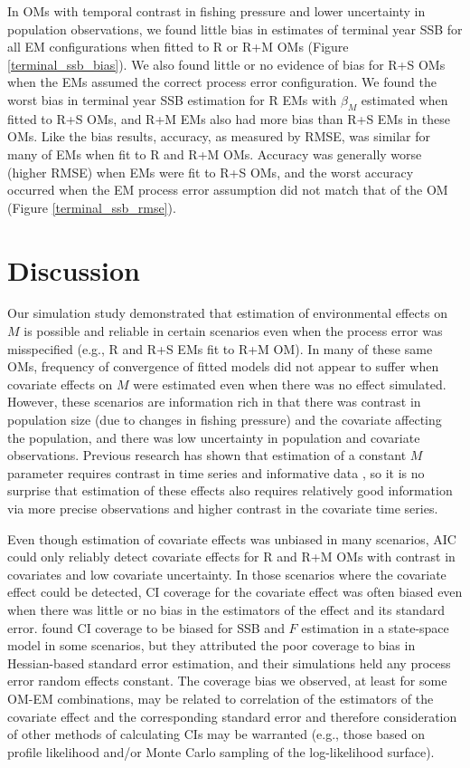 \documentclass[
  12pt,
]{article}
\begin{document}
In OMs with temporal contrast in fishing pressure and lower uncertainty in population observations, we found little bias in estimates of terminal year SSB for all EM configurations when fitted to R or R+M OMs (Figure \ref{terminal_ssb_bias}). We also found little or no evidence of bias for R+S OMs when the EMs assumed the correct process error configuration. We found the worst bias in terminal year SSB estimation for R EMs with \(\beta_M\) estimated when fitted to R+S OMs, and R+M EMs also had more bias than R+S EMs in these OMs. Like the bias results, accuracy, as measured by RMSE, was similar for many of EMs when fit to R and R+M OMs. Accuracy was generally worse (higher RMSE) when EMs were fit to R+S OMs, and the worst accuracy occurred when the EM process error assumption did not match that of the OM (Figure \ref{terminal_ssb_rmse}).

\hypertarget{discussion}{%
\section*{Discussion}\label{discussion}}

Our simulation study demonstrated that estimation of environmental effects on \(M\) is possible and reliable in certain scenarios even when the process error was misspecified (e.g., R and R+S EMs fit to R+M OM). In many of these same OMs, frequency of convergence of fitted models did not appear to suffer when covariate effects on \(M\) were estimated even when there was no effect simulated. However, these scenarios are information rich in that there was contrast in population size (due to changes in fishing pressure) and the covariate affecting the population, and there was low uncertainty in population and covariate observations. Previous research has shown that estimation of a constant \(M\) parameter requires contrast in time series and informative data \citep{leeetal11}, so it is no surprise that estimation of these effects also requires relatively good information via more precise observations and higher contrast in the covariate time series.

Even though estimation of covariate effects was unbiased in many scenarios, AIC could only reliably detect covariate effects for R and R+M OMs with contrast in covariates and low covariate uncertainty. In those scenarios where the covariate effect could be detected, CI coverage for the covariate effect was often biased even when there was little or no bias in the estimators of the effect and its standard error. \citet{cadiganetal24} found CI coverage to be biased for SSB and \(F\) estimation in a state-space model in some scenarios, but they attributed the poor coverage to bias in Hessian-based standard error estimation, and their simulations held any process error random effects constant. The coverage bias we observed, at least for some OM-EM combinations, may be related to correlation of the estimators of the covariate effect and the corresponding standard error and therefore consideration of other methods of calculating CIs may be warranted (e.g., those based on profile likelihood and/or Monte Carlo sampling of the log-likelihood surface).
\end{document}
